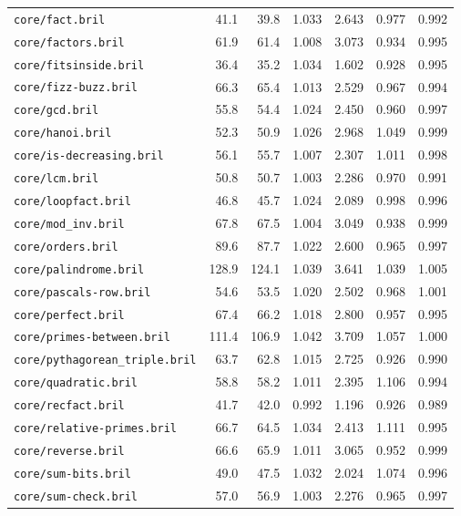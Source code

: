 \begin{longtable}{p{52mm}rrrrrr}
\nolinkurl{core/fact.bril} & 41.1 & 39.8 & 1.033 & 2.643 & 0.977 & 0.992 \\
\nolinkurl{core/factors.bril} & 61.9 & 61.4 & 1.008 & 3.073 & 0.934 & 0.995 \\
\nolinkurl{core/fitsinside.bril} & 36.4 & 35.2 & 1.034 & 1.602 & 0.928 & 0.995 \\
\nolinkurl{core/fizz-buzz.bril} & 66.3 & 65.4 & 1.013 & 2.529 & 0.967 & 0.994 \\
\nolinkurl{core/gcd.bril} & 55.8 & 54.4 & 1.024 & 2.450 & 0.960 & 0.997 \\
\nolinkurl{core/hanoi.bril} & 52.3 & 50.9 & 1.026 & 2.968 & 1.049 & 0.999 \\
\nolinkurl{core/is-decreasing.bril} & 56.1 & 55.7 & 1.007 & 2.307 & 1.011 & 0.998 \\
\nolinkurl{core/lcm.bril} & 50.8 & 50.7 & 1.003 & 2.286 & 0.970 & 0.991 \\
\nolinkurl{core/loopfact.bril} & 46.8 & 45.7 & 1.024 & 2.089 & 0.998 & 0.996 \\
\nolinkurl{core/mod_inv.bril} & 67.8 & 67.5 & 1.004 & 3.049 & 0.938 & 0.999 \\
\nolinkurl{core/orders.bril} & 89.6 & 87.7 & 1.022 & 2.600 & 0.965 & 0.997 \\
\nolinkurl{core/palindrome.bril} & 128.9 & 124.1 & 1.039 & 3.641 & 1.039 & 1.005 \\
\nolinkurl{core/pascals-row.bril} & 54.6 & 53.5 & 1.020 & 2.502 & 0.968 & 1.001 \\
\nolinkurl{core/perfect.bril} & 67.4 & 66.2 & 1.018 & 2.800 & 0.957 & 0.995 \\
\nolinkurl{core/primes-between.bril} & 111.4 & 106.9 & 1.042 & 3.709 & 1.057 & 1.000 \\
\nolinkurl{core/pythagorean_triple.bril} & 63.7 & 62.8 & 1.015 & 2.725 & 0.926 & 0.990 \\
\nolinkurl{core/quadratic.bril} & 58.8 & 58.2 & 1.011 & 2.395 & 1.106 & 0.994 \\
\nolinkurl{core/recfact.bril} & 41.7 & 42.0 & 0.992 & 1.196 & 0.926 & 0.989 \\
\nolinkurl{core/relative-primes.bril} & 66.7 & 64.5 & 1.034 & 2.413 & 1.111 & 0.995 \\
\nolinkurl{core/reverse.bril} & 66.6 & 65.9 & 1.011 & 3.065 & 0.952 & 0.999 \\
\nolinkurl{core/sum-bits.bril} & 49.0 & 47.5 & 1.032 & 2.024 & 1.074 & 0.996 \\
\nolinkurl{core/sum-check.bril} & 57.0 & 56.9 & 1.003 & 2.276 & 0.965 & 0.997 \\

\end{longtable}
